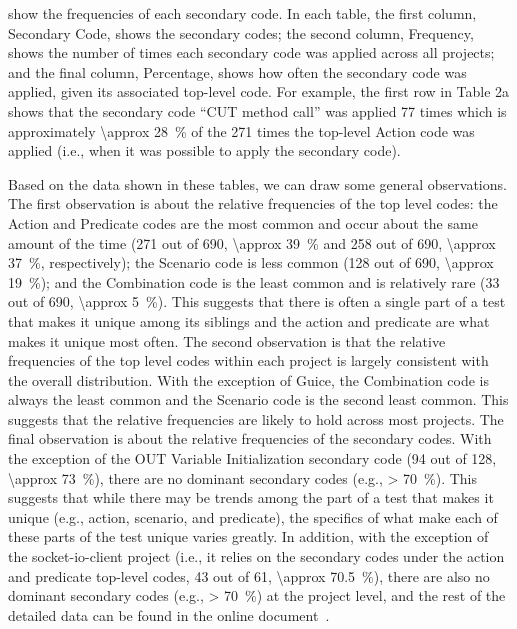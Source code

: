 \documentclass[proposal.tex]{subfiles}
\begin{document}
 show the frequencies of each secondary code.
%
In each table, the first column, Secondary Code, shows the secondary codes; the second column, Frequency, shows the number of times each secondary code was applied across all projects; and the final column, Percentage, shows how often the secondary code was applied, given its associated top-level code.
%
For example, the first row in Table 2a shows that the secondary code \enquote{CUT method call} was applied \num{77} times which is approximately \SI{\approx 28}{\percent} of the \num{271} times the top-level Action code was applied (i.e., when it was possible to apply the secondary code).

Based on the data shown in these tables, we can draw some general observations.
%
The first observation is about the relative frequencies of the top level codes: the Action and Predicate codes are the most common and occur about the same amount of the time (\num{271} out of \num{690}, \SI{\approx 39}{\percent} and \num{258} out of \num{690}, \SI{\approx 37}{\percent}, respectively); the Scenario code is less common (\num{128} out of \num{690}, \SI{\approx 19}{\percent}); and the Combination code is the least common and is relatively rare (\num{33} out of \num{690}, \SI{\approx 5}{\percent}).
%
This suggests that there is often a single part of a test that makes it unique among its siblings and the action and predicate are what makes it unique most often.
%
The second observation is that the relative frequencies of the top level codes within each project is largely consistent with the overall distribution.
%
With the exception of Guice, the Combination code is always the least common and the Scenario code is the second least common.
%
This suggests that the relative frequencies are likely to hold across most projects.
%
The final observation is about the relative frequencies of the secondary codes.  With the exception of the OUT Variable Initialization secondary code (\num{94} out of \num{128}, \SI{\approx 73}{\percent}), there are no dominant secondary codes (e.g., \SI{> 70}{\percent}).
%
This suggests that while there may be trends among the part of a test that makes it unique (e.g., action, scenario, and predicate), the specifics of what make each of these parts of the test unique varies greatly.
%
In addition, with the exception of the socket-io-client project (i.e., it relies on the secondary codes under the action and predicate top-level codes, 43 out of 61, \SI{\approx 70.5}{\percent}), there are also no dominant secondary codes (e.g., \SI{> 70}{\percent}) at the project level, and the rest of the detailed data can be found in the online document~\cite{emp-study}.
\end{document}
